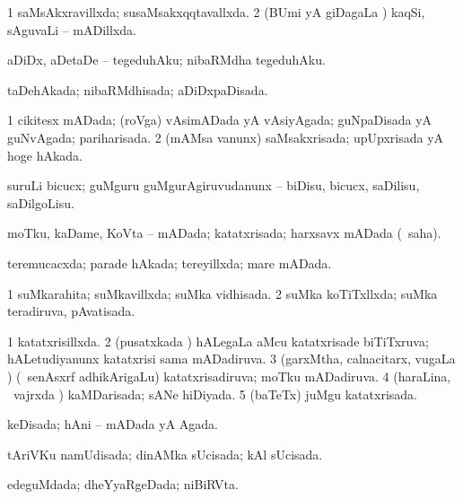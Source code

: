 {\bentry
{} 
\gl{\gu}
\expl{}
\bmng
\bnum
\num{1} saMsAkxravillxda; susaMsakxqqtavallxda. 
\num{2} (BUmi yA giDagaLa \vi) kaqSi, sAguvaLi -- mADillxda. 
\enum
\emng
\eentry

\bentry
{} 
\gl{\akirx}
\expl{}
\bmng
 aDiDx, aDetaDe -- tegeduhAku; nibaRMdha tegeduhAku. 
\emng
\eentry

\bentry
{} 
\gl{\gu}
\expl{}
\bmng
 taDehAkada; nibaRMdhisada; aDiDxpaDisada. 
\emng
\eentry

\bentry
{} 
\gl{\gu}
\expl{}
\bmng
\bnum
\num{1} cikitesx mADada; (roVga) vAsimADada yA vAsiyAgada; guNpaDisada yA guNvAgada; pariharisada. 
\num{2} (mAMsa \mo vanunx) saMsakxrisada; upUpxrisada yA hoge hAkada. 
\enum
\emng
\eentry

\bentry
{} 
\gl{\akirx}
\expl{}
\bmng
 suruLi bicucx; guMguru guMgurAgiruvudanunx -- biDisu, bicucx, saDilisu, saDilgoLisu. 
\emng
\eentry

\bentry
{} 
\gl{\gu}
\expl{}
\bmng
 moTku, kaDame, KoVta -- mADada; katatxrisada; harxsavx mADada (\rUpa\ saha). 
\emng
\eentry

\bentry
{} 
\gl{\gu}
\expl{}
\bmng
 teremucacxda; parade hAkada; tereyillxda; mare mADada. 
\emng
\eentry

\bentry
{} 
\gl{\gu}
\expl{}
\bmng
\bnum
\num{1} suMkarahita; suMkavillxda; suMka vidhisada. 
\num{2} suMka koTiTxllxda; suMka teradiruva, pAvatisada. 
\enum
\emng
\eentry

\bentry
{} 
\gl{\gu}
\expl{}
\bmng
\bnum
\num{1} katatxrisillxda. 
\num{2} (pusatxkada \vi) hALegaLa aMcu katatxrisade biTiTxruva; hALetudiyanunx katatxrisi sama mADadiruva. 
\num{3} (garxMtha, calnacitarx, \mo vugaLa \vi) (\kanmu\ senAsxrf adhikArigaLu) katatxrisadiruva; moTku mADadiruva. 
\num{4} (haraLina, \kanmu\ vajrxda \vi) kaMDarisada; sANe hiDiyada. 
\num{5} (baTeTx) juMgu katatxrisada. 
\enum
\emng
\eentry

\bentry
{} 
\gl{\gu}
\expl{}
\bmng
keDisada; hAni -- mADada yA Agada. 
\emng
\eentry

\bentry
{} 
\gl{\gu}
\bmng
 tAriVKu namUdisada; dinAMka sUcisada; kAl sUcisada. 
\emng
\eentry

\bentry
{} 
\gl{\gu}
\expl{}
\bmng
 edeguMdada; dheYyaRgeDada; niBiRVta. 
\emng
\eentry

}
